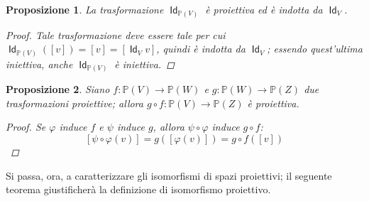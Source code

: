 \documentclass[11pt]{scrartcl}
\theoremstyle{style1}
\newtheorem{prop}{Proposizione}[section]
\numberwithin{equation}{subsection}
\renewcommand{\operatorname}[1]{\mathop{\mathrm{\textsf{#1}}}}
\begin{document}
\begin{prop}
	La trasformazione $\operatorname{Id} _{\mathbb{P}(V)}$ \`e proiettiva ed \`e indotta da $\operatorname{Id} _V$.
	\begin{proof}
		Tale trasformazione deve essere tale per cui $\operatorname{Id} _{\mathbb{P}(V)} ([v]) = [v] = [\operatorname{Id} _V v]$, quindi \`e indotta da $\operatorname{Id} _V$; essendo quest'ultima iniettiva, anche $\operatorname{Id}_{\mathbb{P}(V)}  $ \`e iniettiva.
	\end{proof}
\end{prop}
\begin{prop}
	Siano $f : \mathbb{P}(V) \to \mathbb{P}(W)$ e $g:\mathbb{P}(W) \to \mathbb{P}(Z)$ due trasformazioni proiettive; allora $g\circ f:\mathbb{P}(V)\to \mathbb{P}(Z)$ \`e proiettiva.
	\begin{proof}
		Se $\varphi $ induce $f$ e $\psi $ induce $g$, allora $\psi \circ \varphi $ induce $g \circ f$:
		\[
		\left[ \psi \circ \varphi (v) \right] = g \left(\left[ \varphi (v) \right] \right) = g \circ f \left(\left[ v \right] \right) 
		\] 
	\end{proof}
\end{prop}
\noindent Si passa, ora, a caratterizzare gli isomorfismi di spazi proiettivi; il seguente teorema giustificher\`a la definizione di isomorfismo proiettivo.
\end{document}
